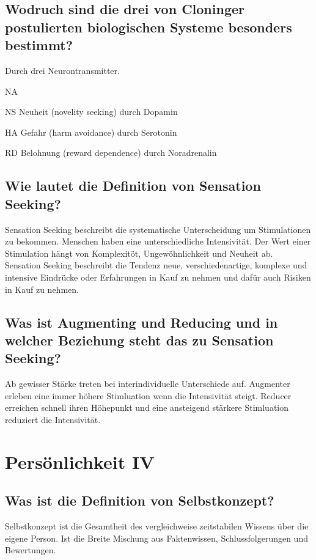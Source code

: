 \documentclass[a6paper,9pt,DIV=14]{scrartcl}
\begin{document}
\subsection{Wodruch sind die drei von Cloninger postulierten biologischen Systeme besonders bestimmt?}
Durch drei Neurontransmitter.
    \begin{labeling}{NA}
    \item [NS] Neuheit (novelity seeking) durch Dopamin
    \item [HA] Gefahr (harm avoidance) durch Serotonin
    \item [RD] Belohnung (reward dependence) durch Noradrenalin
    \end{labeling}
\subsection{Wie lautet die Definition von Sensation Seeking?} %
    Sensation Seeking beschreibt die systematische Unterscheidung um Stimulationen zu bekommen. Menschen haben eine unterschiedliche Intensivität. Der Wert einer Stimulation hängt von Komplexitöt, Ungewöhnlichkeit und Neuheit ab.\\
    Sensation Seeking beschreibt die Tendenz neue, verschiedenartige, komplexe und intensive Eindrücke oder Erfahrungen in Kauf zu nehmen und dafür auch Risiken in Kauf zu nehmen.
\subsection{Was ist Augmenting und Reducing und in welcher Beziehung steht das zu Sensation Seeking?} %
    Ab gewisser Stärke treten bei interindividuelle Unterschiede auf. Augmenter erleben eine immer höhere Stimluation wenn die Intensivität steigt. Reducer erreichen schnell ihren Höhepunkt und eine ansteigend stärkere Stimluation reduziert die Intensivität.

\section{Persönlichkeit IV}
\subsection{Was ist die Definition von Selbstkonzept?} %
Selbstkonzept ist die Gesamtheit des vergleichweise zeitstabilen Wissens über die eigene Person. Ist die Breite Mischung aus Faktenwissen, Schlussfolgerungen und Bewertungen.
\end{document}
